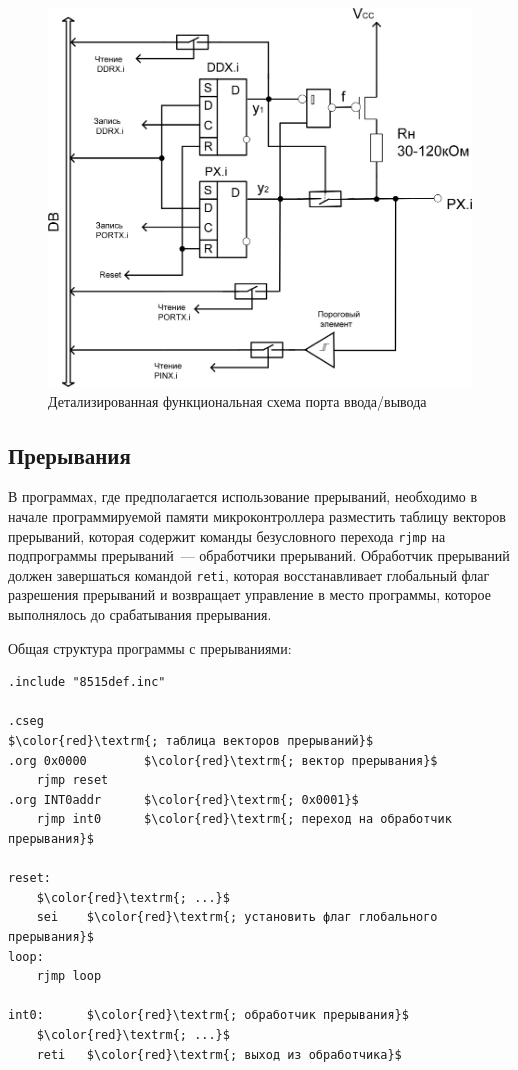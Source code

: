 \documentclass[main.tex]{subfiles}
\begin{document}
\begin{figure}[t]
\centering
\includegraphics[scale=0.30]{images/port2.png}
\caption{Детализированная функциональная схема порта ввода/вывода}
\label{fig:port2}
\end{figure}







\newpage
\subsection{Прерывания}

В программах, где предполагается использование прерываний, необходимо в начале программируемой памяти микроконтроллера разместить таблицу векторов прерываний, которая содержит команды безусловного перехода \texttt{rjmp} на подпрограммы прерываний~--- обработчики прерываний. Обработчик прерываний должен завершаться командой \texttt{reti}, которая восстанавливает глобальный флаг разрешения прерываний и возвращает управление в место программы, которое выполнялось до срабатывания прерывания.

Общая структура программы с прерываниями:

\begin{lstlisting}
.include "8515def.inc"

.cseg
$\color{red}\textrm{; таблица векторов прерываний}$
.org 0x0000        $\color{red}\textrm{; вектор прерывания}$
    rjmp reset
.org INT0addr      $\color{red}\textrm{; 0x0001}$
    rjmp int0      $\color{red}\textrm{; переход на обработчик прерывания}$

reset:
    $\color{red}\textrm{; ...}$
    sei    $\color{red}\textrm{; установить флаг глобального прерывания}$
loop:
    rjmp loop
        
int0:      $\color{red}\textrm{; обработчик прерывания}$
    $\color{red}\textrm{; ...}$
    reti   $\color{red}\textrm{; выход из обработчика}$
\end{lstlisting}
\end{document}
